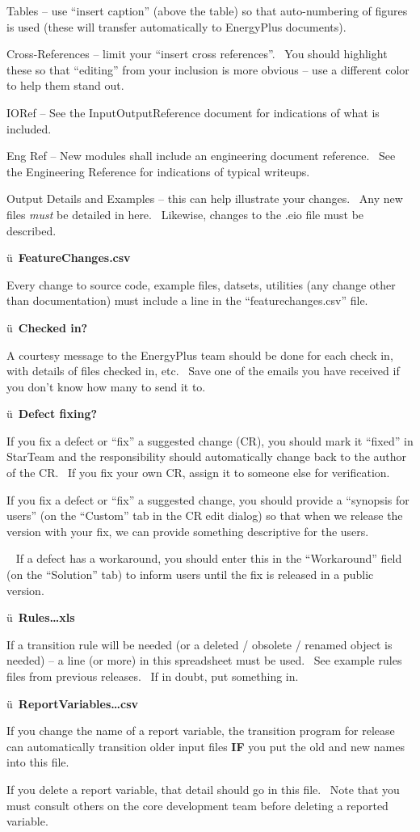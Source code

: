 Tables -- use ``insert caption'' (above the table) so that auto-numbering of figures is used (these will transfer automatically to EnergyPlus documents).

Cross-References -- limit your ``insert cross references''.~ You should highlight these so that ``editing'' from your inclusion is more obvious -- use a different color to help them stand out.

IORef -- See the InputOutputReference document for indications of what is included.

Eng Ref -- New modules shall include an engineering document reference.~ See the Engineering Reference for indications of typical writeups.

Output Details and Examples -- this can help illustrate your changes.~ Any new files \emph{must} be detailed in here.~ Likewise, changes to the .eio file must be described.

ü~\textbf{FeatureChanges.csv}

Every change to source code, example files, datsets, utilities (any change other than documentation) must include a line in the ``featurechanges.csv'' file.

ü~\textbf{Checked in?}

A courtesy message to the EnergyPlus team should be done for each check in, with details of files checked in, etc.~ Save one of the emails you have received if you don't know how many to send it to.

ü~\textbf{Defect fixing?}

If you fix a defect or ``fix'' a suggested change (CR), you should mark it ``fixed'' in StarTeam and the responsibility should automatically change back to the author of the CR.~ If you fix your own CR, assign it to someone else for verification.

If you fix a defect or ``fix'' a suggested change, you should provide a ``synopsis for users'' (on the ``Custom'' tab in the CR edit dialog) so that when we release the version with your fix, we can provide something descriptive for the users.

~ If a defect has a workaround, you should enter this in the ``Workaround'' field (on the ``Solution'' tab) to inform users until the fix is released in a public version.

ü~\textbf{Rules\ldots{}xls}

If a transition rule will be needed (or a deleted / obsolete / renamed object is needed) -- a line (or more) in this spreadsheet must be used.~ See example rules files from previous releases.~ If in doubt, put something in.

ü~\textbf{ReportVariables\ldots{}csv}

If you change the name of a report variable, the transition program for release can automatically transition older input files \textbf{IF} you put the old and new names into this file.

If you delete a report variable, that detail should go in this file.~ Note that you must consult others on the core development team before deleting a reported variable.
